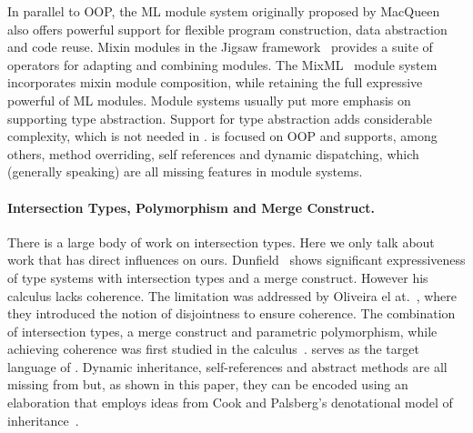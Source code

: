 In parallel to OOP, the ML module system originally proposed by
MacQueen~\citep{MacQueen_1984} also offers powerful support for flexible program
construction, data abstraction and code reuse. Mixin modules in the
Jigsaw framework~\citep{Bracha92modularitymeets} provides a suite of operators
for adapting and combining modules. The MixML~\citep{Rossberg_2013} module
system incorporates mixin module composition, while retaining the full
expressive powerful of ML modules. Module systems usually put more emphasis on
supporting type abstraction. Support for type abstraction
adds considerable complexity, which is not needed in \name. \name is focused on
OOP and supports, among others, method overriding, self references and dynamic
dispatching, which (generally speaking) are all missing features in module systems.



\paragraph{Intersection Types, Polymorphism and Merge Construct.} There
is a large body of work on intersection types. Here we only talk about work that
has direct influences on ours. Dunfield~\citep{dunfield2014elaborating} shows
significant expressiveness of type systems with intersection types and a merge
construct. However his calculus lacks coherence. The limitation was addressed by
Oliveira el at.~\citep{oliveira2016disjoint}, where they introduced the notion of
disjointness to ensure coherence. The combination of intersection types, a merge
construct and parametric polymorphism, while achieving coherence was first
studied in the \fname calculus~\citep{alpuimdisjoint}.
\fname serves as the target language
of \name. Dynamic inheritance, self-references and abstract methods
are all missing from \fname but, as shown in this paper, they can be
encoded using an elaboration that employs ideas from Cook and
Palsberg's denotational model of inheritance~\citep{cook1989denotational}.


